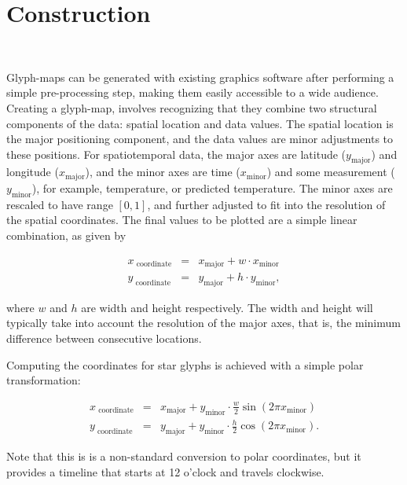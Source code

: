 \documentclass[oneside]{article}
\newcommand\amin{\text{minor}}
\newcommand\amaj{\text{major}}
\begin{document}
\section{Construction}~\label{sec:construction}

Glyph-maps can be generated with existing graphics software after performing a simple pre-processing step, making them easily accessible to a wide audience. Creating a glyph-map, involves recognizing that they combine two structural components of the data: spatial location and data values. The spatial location is the major positioning component, and the data values are minor adjustments to these positions. For spatiotemporal data, the major axes are latitude ($y_{\amaj}$) and longitude ($x_{\amaj}$), and the minor axes are time ($x_{\amin}$) and some measurement ($y_{\amin}$), for example, temperature, or predicted temperature. The minor axes are rescaled to have range $[0, 1]$, and further adjusted to fit into the resolution of the spatial coordinates. The final values to be plotted are a simple linear combination, as given by

\begin{equation}
  \begin{array}{lll}
  x_\text{ coordinate}&=& x_{\amaj} + w \cdot x_{\amin}\\
  y_\text{ coordinate}&=& y_{\amaj} + h \cdot y_{\amin}, 
  \end{array}
  \label{coords.eqn}
\end{equation}

\noindent where $w$ and $h$ are width and height respectively. The width and height will typically take into account the resolution of the major axes, that is, the minimum difference between consecutive locations.

Computing the coordinates for star glyphs is achieved with a simple polar transformation: 

\begin{equation}
  \begin{array}{lll}
  x_\text{ coordinate}&=& x_{\amaj} + y_{\amin} \cdot \frac{w}{2} \sin(2 \pi x_{\amin}) \\
  y_\text{ coordinate}&=& y_{\amaj} + y_{\amin} \cdot \frac{h}{2} \cos(2 \pi x_{\amin}).
  \end{array}
  \label{coords.polar.eqn}
\end{equation}

\noindent Note that this is is a non-standard conversion to polar coordinates, but it provides a timeline that starts at 12 o'clock and travels clockwise.
\end{document}
